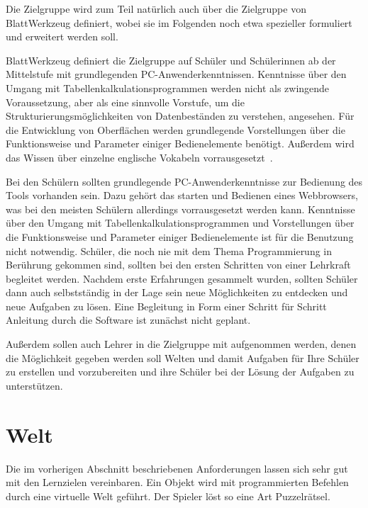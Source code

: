 Die Zielgruppe wird zum Teil natürlich auch über die Zielgruppe von BlattWerkzeug definiert, wobei sie im Folgenden noch etwa spezieller formuliert und erweitert werden soll.

BlattWerkzeug definiert die Zielgruppe auf Schüler und Schülerinnen ab der Mittelstufe mit grundlegenden PC-Anwenderkenntnissen. Kenntnisse über den Umgang mit Tabellenkalkulationsprogrammen werden nicht als zwingende Voraussetzung, aber als eine sinnvolle Vorstufe, um die Strukturierungsmöglichkeiten von Datenbeständen zu verstehen, angesehen. Für die Entwicklung von Oberflächen werden grundlegende Vorstellungen über die Funktionsweise und Parameter einiger Bedienelemente benötigt. Außerdem wird das Wissen über einzelne englische Vokabeln vorrausgesetzt~\cite[22-23]{riemer2016}.

Bei den Schülern sollten grundlegende PC-Anwenderkenntnisse zur Bedienung des Tools vorhanden sein. Dazu gehört das starten und Bedienen eines Webbrowsers, was bei den meisten Schülern allerdings vorrausgesetzt werden kann. Kenntnisse über den Umgang mit Tabellenkalkulationsprogrammen und Vorstellungen über die Funktionsweise und Parameter einiger Bedienelemente ist für die Benutzung nicht notwendig. Schüler, die noch nie mit dem Thema Programmierung in Berührung gekommen sind, sollten bei den ersten Schritten von einer Lehrkraft begleitet werden. Nachdem erste Erfahrungen gesammelt wurden, sollten Schüler dann auch selbstständig in der Lage sein neue Möglichkeiten zu entdecken und neue Aufgaben zu lösen. Eine Begleitung in Form einer Schritt für Schritt Anleitung durch die Software ist zunächst nicht geplant.

Außerdem sollen auch Lehrer in die Zielgruppe mit aufgenommen werden, denen die Möglichkeit gegeben werden soll Welten und damit Aufgaben für Ihre Schüler zu erstellen und vorzubereiten  und ihre Schüler bei der Lösung der Aufgaben zu unterstützen.

\section{Welt}
\label{sec:requirements:world}

Die im vorherigen Abschnitt beschriebenen Anforderungen lassen sich sehr gut mit den Lernzielen vereinbaren. Ein Objekt wird mit programmierten Befehlen durch eine virtuelle Welt geführt. Der Spieler löst so eine Art Puzzelrätsel.

